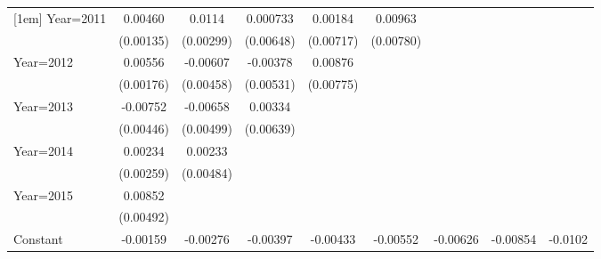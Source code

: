 \begin{table}[htbp]
\begin{tabular}{l*{8}{c}}
[1em]
Year=2011           &     0.00460\sym{***}&      0.0114\sym{***}&    0.000733         &     0.00184         &     0.00963         &                     &                     &                     \\
                    &   (0.00135)         &   (0.00299)         &   (0.00648)         &   (0.00717)         &   (0.00780)         &                     &                     &                     \\
[1em]
Year=2012           &     0.00556\sym{***}&    -0.00607         &    -0.00378         &     0.00876         &                     &                     &                     &                     \\
                    &   (0.00176)         &   (0.00458)         &   (0.00531)         &   (0.00775)         &                     &                     &                     &                     \\
[1em]
Year=2013           &    -0.00752\sym{*}  &    -0.00658         &     0.00334         &                     &                     &                     &                     &                     \\
                    &   (0.00446)         &   (0.00499)         &   (0.00639)         &                     &                     &                     &                     &                     \\
[1em]
Year=2014           &     0.00234         &     0.00233         &                     &                     &                     &                     &                     &                     \\
                    &   (0.00259)         &   (0.00484)         &                     &                     &                     &                     &                     &                     \\
[1em]
Year=2015           &     0.00852\sym{*}  &                     &                     &                     &                     &                     &                     &                     \\
                    &   (0.00492)         &                     &                     &                     &                     &                     &                     &                     \\
[1em]
Constant            &    -0.00159\sym{***}&    -0.00276\sym{***}&    -0.00397\sym{***}&    -0.00433\sym{***}&    -0.00552\sym{***}&    -0.00626\sym{***}&    -0.00854\sym{**} &     -0.0102         \\

\end{tabular}
\end{table}
